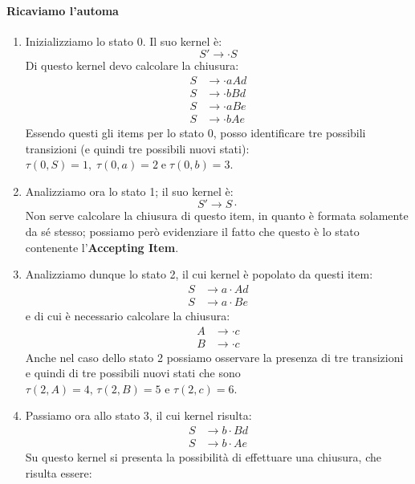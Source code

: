 \documentclass[class=book, crop=false, oneside, 12pt]{standalone}
\begin{document}
\paragraph{Ricaviamo l'automa}
\begin{enumerate}
    \item Inizializziamo lo stato 0. Il suo kernel è:
    \begin{equation*}
        S' \to \cdot S
    \end{equation*}
    Di questo kernel devo calcolare la chiusura:
    \begin{align*}
        S &\to \cdot aAd \\
    	S &\to \cdot bBd \\
    	S &\to \cdot aBe \\
    	S &\to \cdot bAe
    \end{align*}
    Essendo questi gli items per lo stato 0, posso identificare tre possibili transizioni (e quindi tre possibili nuovi stati): \(\tau(0,S)=1, \; \tau(0,a)=2 \; \textrm{e} \; \tau(0,b)=3\).
    \item Analizziamo ora lo stato 1; il suo kernel è:
    \begin{equation*}
        S' \to S \cdot    
    \end{equation*}
    Non serve calcolare la chiusura di questo item, in quanto è formata solamente da sé stesso; possiamo però evidenziare il fatto che questo è lo stato contenente l'\textbf{Accepting Item}.
    \item Analizziamo dunque lo stato 2, il cui kernel è popolato da questi item:
    \begin{align*}
        S &\to a \cdot Ad \\
        S &\to a \cdot Be
    \end{align*}
    e di cui è necessario calcolare la chiusura:
    \begin{align*}
        A &\to \cdot c \\
        B &\to \cdot c
    \end{align*}
    Anche nel caso dello stato 2 possiamo osservare la presenza di tre transizioni e quindi di tre possibili nuovi stati che sono \(\tau(2,A)=4 \textrm{, } \tau(2,B)=5 \textrm{ e } \tau(2,c)=6\).
    \item Passiamo ora allo stato 3, il cui kernel risulta:
    \begin{align*}
        S &\to b \cdot Bd \\
        S &\to b \cdot Ae
    \end{align*}
    Su questo kernel si presenta la possibilità di effettuare una chiusura, che risulta essere:

\end{enumerate}
\end{document}

